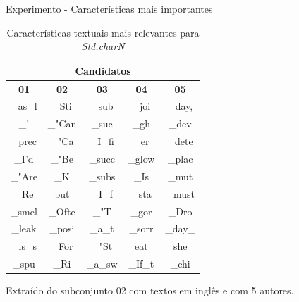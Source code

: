 \begin{frame}{Experimento -  Características mais importantes}
	\setlength{\tabcolsep}{15pt}\selectFont
	\begin{table}[h]
	\centering
	\caption{Características textuais mais relevantes para {\em Std.charN}}
	\label{tableTop.Std.charN}
	\begin{tabular}{c|c|c|c|c}
		\toprule
		         \multicolumn{5}{c}{\bf Candidatos}          \\ \hline
		{\bf 01} & {\bf 02} & {\bf 03} & {\bf 04} & {\bf 05} \\ \midrule
		\_as\_l  &  \_Sti   &  \_sub   &  \_joi   &  \_day,  \\
		  \_'    &  \_"Can  &  \_suc   &   \_gh   &  \_dev   \\
		 \_prec  &  \_"Ca   & \_I\_fi  &   \_er   &  \_dete  \\
		 \_I'd   &  \_"Be   &  \_succ  &  \_glow  &  \_plac  \\
		 \_"Are  &   \_K    &  \_subs  &   \_Is   &  \_mut   \\
		  \_Re   & \_but\_  &  \_I\_f  &  \_sta   &  \_must  \\
		 \_smel  &  \_Ofte  &   \_"T   &  \_gor   &  \_Dro   \\
		 \_leak  &  \_posi  &  \_a\_t  &  \_sorr  & \_day\_  \\
		\_is\_s  &  \_For   &  \_"St   & \_eat\_  & \_she\_  \\
		 \_spu   &   \_Ri   & \_a\_sw  & \_If\_t  &  \_chi   \\ \bottomrule
	\end{tabular}
	\end{table}
	{\selectFont Extraído do subconjunto 02 com textos em inglês e com 5 autores.}
\end{frame}

